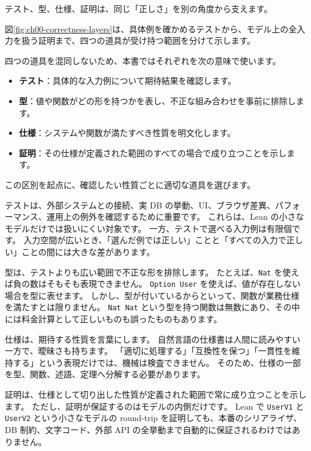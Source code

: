 テスト、型、仕様、証明は、同じ「正しさ」を別の角度から支えます。

図\ref{fig:ch00-correctness-layers}は、具体例を確かめるテストから、モデル上の全入力を扱う証明まで、四つの道具が受け持つ範囲を分けて示します。


四つの道具を混同しないため、本書ではそれぞれを次の意味で使います。
\begin{itemize}
\item \textbf{テスト}：具体的な入力例について期待結果を確認します。
\item \textbf{型}：値や関数がどの形を持つかを表し、不正な組み合わせを事前に排除します。
\item \textbf{仕様}：システムや関数が満たすべき性質を明文化します。
\item \textbf{証明}：その仕様が定義された範囲のすべての場合で成り立つことを示します。
\end{itemize}

この区別を起点に、確認したい性質ごとに適切な道具を選びます。

テストは、外部システムとの接続、実 DB の挙動、UI、ブラウザ差異、パフォーマンス、運用上の例外を確認するために重要です。
これらは、Lean の小さなモデルだけでは扱いにくい対象です。
一方、テストで選べる入力例は有限個です。
入力空間が広いとき、「選んだ例では正しい」ことと「すべての入力で正しい」ことの間には大きな差があります。

型は、テストよりも広い範囲で不正な形を排除します。
たとえば、\texttt{Nat} を使えば負の数はそもそも表現できません。
\texttt{Option User} を使えば、値が存在しない場合を型に表せます。
しかし、型が付いているからといって、関数が業務仕様を満たすとは限りません。
\texttt{Nat \to Nat} という型を持つ関数は無数にあり、その中には料金計算として正しいものも誤ったものもあります。

仕様は、期待する性質を言葉にします。
自然言語の仕様書は人間に読みやすい一方で、曖昧さも持ちます。
「適切に処理する」「互換性を保つ」「一貫性を維持する」という表現だけでは、機械は検査できません。
そのため、仕様の一部を型、関数、述語、定理へ分解する必要があります。

証明は、仕様として切り出した性質が定義された範囲で常に成り立つことを示します。
ただし、証明が保証するのはモデルの内側だけです。
Lean で \texttt{UserV1} と \texttt{UserV2} という小さなモデルの round-trip を証明しても、本番のシリアライザ、DB 制約、文字コード、外部 API の全挙動まで自動的に保証されるわけではありません。

